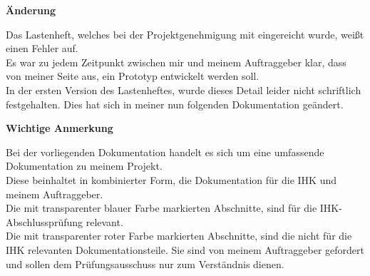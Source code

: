 \vspace{2cm}

\begin{center}
\begin{Huge}
\textbf{Änderung}
\end{Huge}
\end{center}
Das Lastenheft, welches bei der Projektgenehmigung mit eingereicht wurde, weißt einen Fehler auf. 
\\
Es war zu jedem Zeitpunkt zwischen mir und meinem Auftraggeber klar, dass von meiner Seite aus, ein Prototyp entwickelt werden soll.
\\
In der ersten Version des Lastenheftes, wurde dieses Detail leider nicht schriftlich festgehalten. Dies hat sich in meiner nun folgenden Dokumentation geändert. 


\vspace{5cm}

\begin{Huge}
\begin{center}
\textbf{Wichtige Anmerkung}
\end{center}
\end{Huge}
Bei der vorliegenden Dokumentation handelt es sich um eine umfassende Dokumentation zu meinem Projekt. 
\\
Diese beinhaltet in kombinierter Form, die Dokumentation für die IHK und meinem Auftraggeber.
\\
Die mit transparenter blauer Farbe markierten Abschnitte, sind für die IHK-Abschlussprüfung relevant. 
\\
Die mit transparenter roter Farbe markierten Abschnitte, sind die nicht für die IHK relevanten Dokumentationsteile. Sie sind von meinem Auftraggeber gefordert und sollen dem Prüfungsausschuss nur zum Verständnis dienen.



